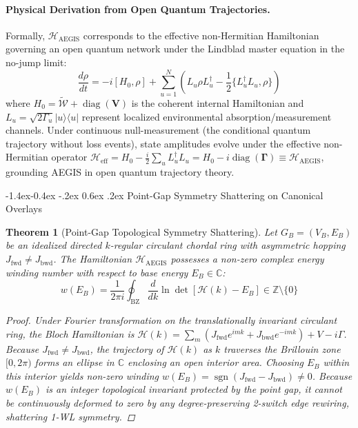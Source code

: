 \documentclass[10pt,twocolumn,letterpaper]{article}
\makeatletter
\renewcommand\subsection{\@startsection{subsection}{2}{\z@}%
                                     {-1.4ex\@plus -0.4ex \@minus -.2ex}%
                                     {0.6ex \@plus .2ex}%
                                     {\normalfont\normalsize\bfseries}}
\newtheorem{theorem}{Theorem}
\makeatother
\begin{document}
\paragraph{Physical Derivation from Open Quantum Trajectories.}
Formally, $\mathcal{H}_{\text{AEGIS}}$ corresponds to the effective non-Hermitian Hamiltonian governing an open quantum network under the Lindblad master equation in the no-jump limit:
\begin{equation}
\frac{d\rho}{dt} = -i [H_0, \rho] + \sum_{u=1}^N \left( L_u \rho L_u^\dagger - \frac{1}{2} \{L_u^\dagger L_u, \rho\} \right)
\end{equation}
where $H_0 = \tilde{\mathcal{W}} + \operatorname{diag}(\mathbf{V})$ is the coherent internal Hamiltonian and $L_u = \sqrt{2\Gamma_u} |u\rangle\langle u|$ represent localized environmental absorption/measurement channels. Under continuous null-measurement (the conditional quantum trajectory without loss events), state amplitudes evolve under the effective non-Hermitian operator $\mathcal{H}_{\text{eff}} = H_0 - \frac{i}{2} \sum_u L_u^\dagger L_u = H_0 - i \operatorname{diag}(\boldsymbol{\Gamma}) \equiv \mathcal{H}_{\text{AEGIS}}$, grounding AEGIS in open quantum trajectory theory.

\subsection{Point-Gap Symmetry Shattering on Canonical Overlays}

\begin{theorem}[Point-Gap Topological Symmetry Shattering]
\label{thm:point_gap}
Let $G_B = (V_B, E_B)$ be an idealized directed $k$-regular circulant chordal ring with asymmetric hopping $J_{\text{fwd}} \ne J_{\text{bwd}}$. The Hamiltonian $\mathcal{H}_{\text{AEGIS}}$ possesses a non-zero complex energy winding number with respect to base energy $E_B \in \mathbb{C}$:
\begin{equation}
w(E_B) = \frac{1}{2\pi i} \oint_{\mathrm{BZ}} \frac{d}{dk} \ln \det[\mathcal{H}(k) - E_B] \in \mathbb{Z} \setminus \{0\}
\end{equation}
\begin{proof}
Under Fourier transformation on the translationally invariant circulant ring, the Bloch Hamiltonian is $\mathcal{H}(k) = \sum_{m} (J_{\text{fwd}} e^{i m k} + J_{\text{bwd}} e^{-i m k}) + V - i\Gamma$. Because $J_{\text{fwd}} \ne J_{\text{bwd}}$, the trajectory of $\mathcal{H}(k)$ as $k$ traverses the Brillouin zone $[0, 2\pi)$ forms an ellipse in $\mathbb{C}$ enclosing an open interior area. Choosing $E_B$ within this interior yields non-zero winding $w(E_B) = \operatorname{sgn}(J_{\text{fwd}} - J_{\text{bwd}}) \ne 0$. Because $w(E_B)$ is an integer topological invariant protected by the point gap, it cannot be continuously deformed to zero by any degree-preserving 2-switch edge rewiring, shattering 1-WL symmetry.
\end{proof}
\end{theorem}
\end{document}

